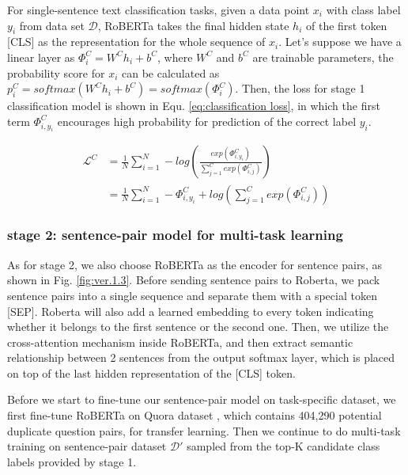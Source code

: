 \documentclass[letterpaper]{article} %
\begin{document}
  For single-sentence text classification tasks, given a data point $x_{i}$ with
  class  label  $y_{i}$  from  data  set  $\mathcal{D}$, RoBERTa takes the final
  hidden  state  $h_{i}$  of the first token [CLS] as the representation for the
  whole   sequence  of  $x_{i}$.  Let's  suppose  we  have  a  linear  layer  as
  ${\Phi}^C_{i}=W^Ch_{i}+b^C$,  where  $W^C$ and $b^C$ are trainable parameters,
  the    probability    score    for    $x_{i}$    can    be    calculated    as
  $p^C_{i}=softmax(W^Ch_{i}+b^C)=softmax({\Phi}^C_{i})$.   Then,  the  loss  for
  stage 1 classification model is shown in Equ. \ref{eq:classification loss}, in
  which  the  first  term  $\varPhi_{i,y_{i}}^C$ encourages high probability for
  prediction of the correct label $y_{i}$.

  \begin{equation}
    \begin{aligned}
      \mathcal{L}^{C}&=\frac{1}{N}\sum_{i=1}^{N}-log(\frac{exp(\varPhi_{i,y_{i}}^C)}{\sum_{j=1}^{C}exp(\varPhi_{i,j}^C)}) \\&=\frac{1}{N}\sum_{i=1}^{N}-\varPhi_{i,y_{i}}^C+log(\sum_{j=1}^{C}exp(\varPhi_{i,j}^C))
      \label{eq:classification loss}
    \end{aligned}
  \end{equation}

  \subsubsection*{
    stage 2: sentence-pair model for multi-task learning
  }

  As for  stage 2, we also choose RoBERTa as the encoder for sentence pairs, as
  shown  in Fig. \ref{fig:ver.1.3}. Before sending sentence pairs to Roberta, we
  pack  sentence  pairs  into a single sequence and separate them with a special
  token  [SEP].  Roberta  will  also  add  a  learned  embedding  to every token
  indicating  whether  it belongs to the first sentence or the second one. Then,
  we  utilize  the  cross-attention  mechanism  inside RoBERTa, and then extract
  semantic relationship between 2 sentences from the output softmax layer, which
  is placed on top of the last hidden representation of the [CLS] token.

  Before we start to fine-tune our sentence-pair model on task-specific dataset,
  we   first  fine-tune  RoBERTa  on  Quora  dataset \cite{iyer2017first},  which
  contains  404,290  potential  duplicate question pairs, for transfer learning.
  Then   we   continue  to  do  multi-task  training  on  sentence-pair  dataset
  $\mathcal{D'}$ sampled from the top-K candidate class labels provided by stage
  1.
\end{document}
